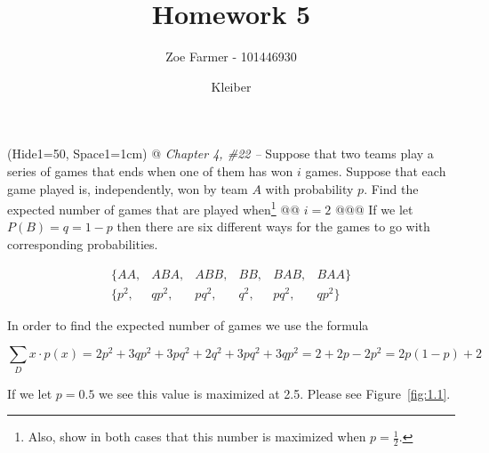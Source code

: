 \documentclass[10pt]{article}
\title{Homework 5}
\date{Kleiber}
\author{Zoe Farmer - 101446930}
\begin{document}
\maketitle

\begin{table}[!ht]
    \centering
\end{table}

\begin{easylist}[enumerate]
    \ListProperties(Hide1=50, Space1=1cm)
    @ \textit{Chapter 4, \#22 --} Suppose that two teams play a series of games that ends when one of them has won $i$
    games. Suppose that each game played is, independently, won by team $A$ with probability $p$. Find the expected
    number of games that are played when\footnote{Also, show in both cases that this number is maximized when
    $p=\frac{1}{2}$.}
    @@ $i = 2$
    @@@ If we let $P(B) = q = 1 - p$ then there are six different ways for the games to go with corresponding
    probabilities.

        \[ \begin{aligned}
            \{ AA,& ABA,& ABB,& BB,& BAB,& BAA \}\\
            \{ p^2,& qp^2,& pq^2,& q^2,& pq^2,& qp^2\}
        \end{aligned} \]

    In order to find the expected number of games we use the formula

        \[ \sum_D x \cdot p(x) = 2 p^2 + 3qp^2 + 3pq^2 + 2q^2 + 3pq^2 + 3qp^2 = 2 + 2 p - 2 p^2 = 2p(1-p)+2 \]

    If we let $p=0.5$ we see this value is maximized at 2.5. Please see Figure~\ref{fig:1.1}.


\end{easylist}
\end{document}
